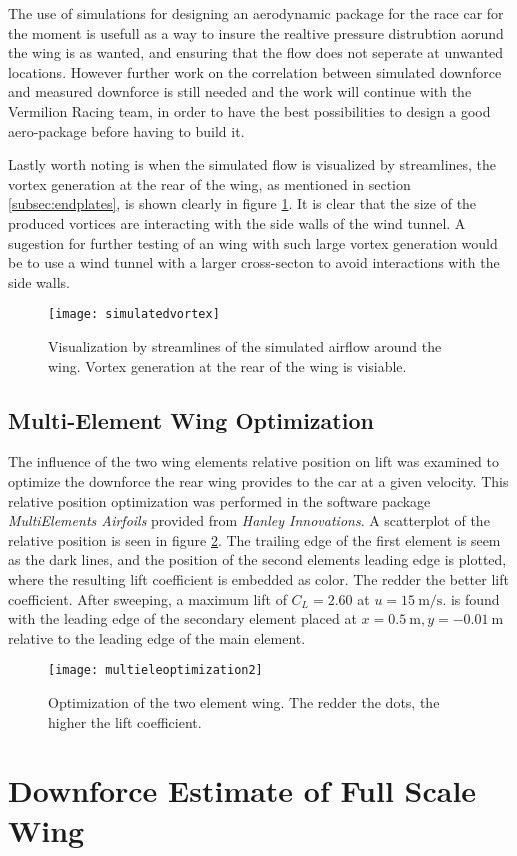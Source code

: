   The use of simulations for designing an aerodynamic package for the race car for the moment is usefull as a way to insure the realtive pressure distrubtion aorund the wing is as wanted, and ensuring that the flow does not seperate at unwanted locations. However further work on the correlation between simulated downforce and measured downforce is still needed and the work will continue with the Vermilion Racing team, in order to have the best possibilities to design a good aero-package before having to build it.

  Lastly worth noting is when the simulated flow is visualized by streamlines, the vortex generation at the rear of the wing, as mentioned in section \ref{subsec:endplates}, is shown clearly in figure \ref{fig:simvortex}. It is clear that the size of the produced vortices are interacting with the side walls of the wind tunnel. A sugestion for further testing of an wing with such large vortex generation would be to use a wind tunnel with a larger cross-secton to avoid interactions with the side walls.

  \begin{figure}
    \texttt{[image: simulatedvortex]}
    \caption{Visualization by streamlines of the simulated airflow around the wing. Vortex generation at the rear of the wing is visiable.}
    \label{fig:simvortex}
  \end{figure}

  \subsection{Multi-Element Wing Optimization}
  The influence of the two wing elements relative position on lift was examined to optimize the downforce the rear wing provides to the car at a given velocity. This relative position optimization was performed in the software package \emph{MultiElements Airfoils} provided from \emph{Hanley Innovations}. A scatterplot of the relative position is seen in figure \ref{fig:multieleoptimization}. The trailing edge of the first element is seem as the dark lines, and the position of the second elements leading edge is plotted, where the resulting lift coefficient is embedded as color. The redder the better lift coefficient. After sweeping, a maximum lift of $C_L = 2.60$  at $u = \SI{15}{\metre\per\second}$. is found with the leading edge of the secondary element placed at $x=\SI{0.5}{\metre},y=\SI{-0.01}{\metre}$ relative to the leading edge of the main element.

  \begin{figure}
    \texttt{[image: multieleoptimization2]}
    \caption{Optimization of the two element wing. The redder the dots, the higher the lift coefficient.}
    \label{fig:multieleoptimization}
  \end{figure}

\section{Downforce Estimate of Full Scale Wing}

